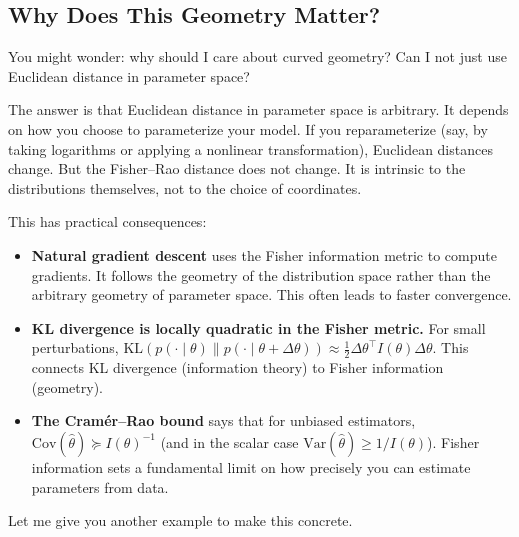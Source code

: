 \vspace{1.5em}

\subsection{Why Does This Geometry Matter?}

You might wonder: why should I care about curved geometry? Can I not just use Euclidean distance in parameter space?

The answer is that Euclidean distance in parameter space is arbitrary. It depends on how you choose to parameterize your model. If you reparameterize (say, by taking logarithms or applying a nonlinear transformation), Euclidean distances change. But the Fisher--Rao distance does not change. It is intrinsic to the distributions themselves, not to the choice of coordinates.

\vspace{1em}

This has practical consequences:

\begin{itemize}
\item \textbf{Natural gradient descent} uses the Fisher information metric to compute gradients. It follows the geometry of the distribution space rather than the arbitrary geometry of parameter space. This often leads to faster convergence.

\item \textbf{KL divergence is locally quadratic in the Fisher metric.} For small perturbations, $\text{KL}(p(\cdot \mid \theta) \| p(\cdot \mid \theta + \Delta\theta)) \approx \frac{1}{2} \Delta\theta^\top I(\theta) \Delta\theta$. This connects KL divergence (information theory) to Fisher information (geometry).

\item \textbf{The Cramér--Rao bound} says that for unbiased estimators, $\mathrm{Cov}(\hat{\theta}) \succeq I(\theta)^{-1}$ (and in the scalar case $\mathrm{Var}(\hat{\theta}) \ge 1/I(\theta)$). Fisher information sets a fundamental limit on how precisely you can estimate parameters from data.
\end{itemize}

\vspace{2em}

Let me give you another example to make this concrete.

\vspace{1.5em}

